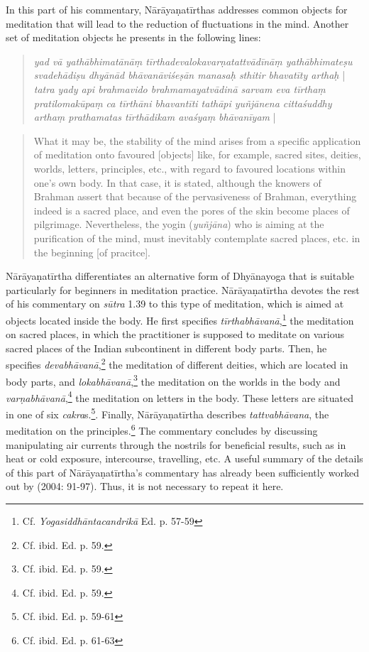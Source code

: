 In this part of his commentary, Nārāyaṇatīrthas addresses common objects for meditation that will lead to the reduction of fluctuations in the mind. Another set of meditation objects he presents in the following lines:

\begin{quote}
\textit{yad vā yathābhimatānāṃ tīrthadevalokavarṇatattvādīnāṃ yathābhimateṣu svadehādiṣu dhyānād bhāvanāviśeṣān manasaḥ sthitir bhavatīty arthaḥ} | \textit{tatra yady api brahmavido brahmamayatvādinā sarvam eva tīrthaṃ pratilomakūpaṃ ca tīrthāni bhavantīti tathāpi yuñjānena cittaśuddhy arthaṃ prathamatas tīrthādikam avaśyaṃ bhāvanīyam} |
\end{quote}
\begin{quote}
What it may be, the stability of the mind arises from a specific application of meditation onto favoured [objects] like, for example, sacred sites, deities, worlds, letters, principles, etc., with regard to favoured locations within one's own body. In that case, it is stated, although the knowers of Brahman assert that because of the pervasiveness of Brahman, everything indeed is a sacred place, and even the pores of the skin become places of pilgrimage. Nevertheless, the yogin (\textit{yuñjāna}) who is aiming at the purification of the mind, must inevitably contemplate sacred places, etc. in the beginning [of pracitce].   
  \end{quote}

  Nārāyaṇatīrtha differentiates an alternative form of Dhyānayoga that is suitable particularly for beginners in meditation practice. Nārāyaṇatīrtha devotes the rest of his commentary on \textit{sūtra} 1.39 to this type of meditation, which is aimed at objects located inside the body. He first specifies \textit{tīrthabhāvanā},\footnote{Cf. \emph{Yogasiddhāntacandrikā} Ed. p. 57-59} the meditation on sacred places, in which the practitioner is supposed to meditate on various sacred places of the Indian subcontinent in different body parts. Then, he specifies \textit{devabhāvanā},\footnote{Cf. ibid. Ed. p. 59.} the meditation of different deities, which are located in body parts, and \textit{lokabhāvanā},\footnote{Cf. ibid. Ed. p. 59.} the meditation on the worlds in the body and \textit{varṇabhāvanā},\footnote{Cf. ibid. Ed. p. 59.} the meditation on letters in the body. These letters are situated in one of six \textit{cakra}s.\footnote{Cf. ibid. Ed. p. 59-61}. Finally, Nārāyaṇatīrtha describes \textit{tattvabhāvana}, the meditation on the principles.\footnote{Cf. ibid. Ed. p. 61-63} The commentary concludes by discussing manipulating air currents through the nostrils for beneficial results, such as in heat or cold exposure, intercourse, travelling, etc. A useful summary of the details of this part of Nārāyaṇatīrtha's commentary has already been sufficiently worked out by \citeauthor{penna2004} (2004: 91-97). Thus, it is not necessary to repeat it here.
  
